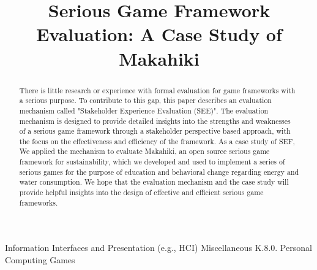 \documentclass{sigchi}
\begin{document}
\title{Serious Game Framework Evaluation: A Case Study of Makahiki}


\maketitle

\begin{abstract}
There is little research or experience with formal evaluation for game frameworks with a serious purpose. To contribute to this gap, this paper describes an evaluation mechanism called "Stakeholder Experience Evaluation (SEE)". The evaluation mechanism is designed to provide detailed insights into the strengths and weaknesses of a serious game framework through a stakeholder perspective based approach, with the focus on the effectiveness and efficiency of the framework. As a case study of SEF, We applied the mechanism to evaluate Makahiki, an open source serious game framework for sustainability, which we developed and used to implement a series of serious games for the purpose of education and behavioral change regarding energy and water consumption. We hope that the evaluation mechanism and the case study will provide helpful insights into the design of effective and efficient serious game frameworks.

\end{abstract}


 {Information Interfaces and Presentation (e.g., HCI)} {Miscellaneous}
 {K.8.0.} {Personal Computing} {Games}

\end{document}
